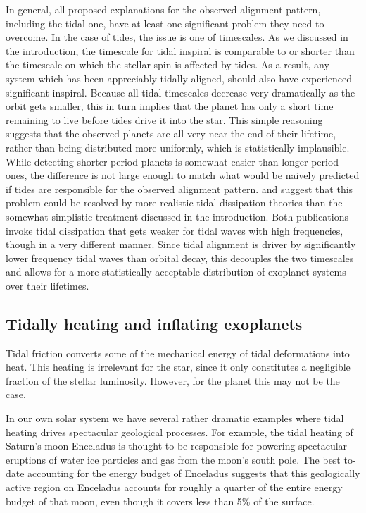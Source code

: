 In general, all proposed explanations for the observed alignment pattern,
including the tidal one, have at least one significant problem they need to
overcome. In the case of tides, the issue is one of timescales. As we discussed
in the introduction, the timescale for tidal inspiral is comparable to or
shorter than the timescale on which the stellar spin is affected by tides. As a
result, any system which has been appreciably tidally aligned, should also have
experienced significant inspiral. Because all tidal timescales decrease very
dramatically as the orbit gets smaller, this in turn implies that the planet has
only a short time remaining to live before tides drive it into the star. This
simple reasoning suggests that the observed planets are all very near the end of
their lifetime, rather than being distributed more uniformly, which is
statistically implausible. While detecting shorter period planets is somewhat
easier than longer period ones, the difference is not large enough to match what
would be naively predicted if tides are responsible for the observed alignment
pattern. \citet{Lai_12} and \citet{Anderson_et_al_21} suggest that this problem
could be resolved by more realistic tidal dissipation theories than the somewhat
simplistic treatment discussed in the introduction. Both publications invoke
tidal dissipation that gets weaker for tidal waves with high frequencies, though
in a very different manner. Since tidal alignment is driver by significantly
lower frequency tidal waves than orbital decay, this decouples the two
timescales and allows for a more statistically acceptable distribution of
exoplanet systems over their lifetimes.

\subsection{Tidally heating and inflating exoplanets}

Tidal friction converts some of the mechanical energy of tidal deformations into
heat. This heating is irrelevant for the star, since it only constitutes a
negligible fraction of the stellar luminosity. However, for the planet this may
not be the case.

In our own solar system we have several rather dramatic examples where
tidal heating drives spectacular geological processes. For example, the tidal
heating of Saturn's moon Enceladus is thought to be responsible for powering
spectacular eruptions of water ice particles and gas from the moon's south pole.
The best to-date accounting for the energy budget of Enceladus suggests that
this geologically active region on Enceladus accounts for roughly a quarter of
the entire energy budget of that moon, even though it covers less than 5\% of
the surface.

